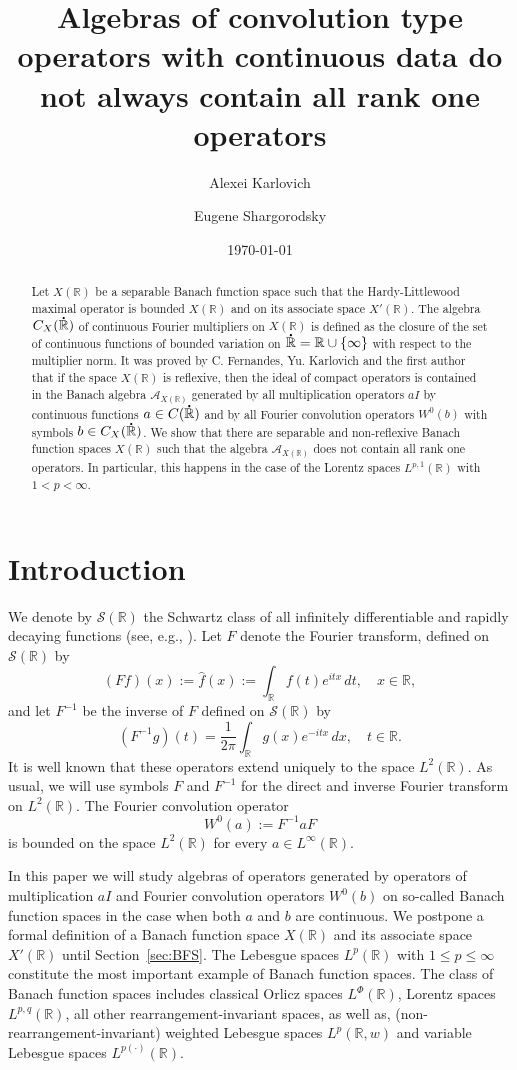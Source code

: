 \documentclass[reqno]{amsproc}
\title[Algebras of convolution type operators]
{Algebras of convolution type operators with continuous data do not 
always contain all rank one operators}
\author[A. Karlovich]{Alexei Karlovich}
\author[E. Shargorodsky]{Eugene Shargorodsky}
\date{\today}
\newcommand{\dR}{{\bf\dot{\R}}}
\newcommand{\R}{\mathbb{R}}
\theoremstyle{definition}
\theoremstyle{remark}
\numberwithin{equation}{section}
\begin{document}
\begin{abstract}
Let $X(\mathbb{R})$ be a separable Banach function space such that the 
Hardy-Littlewood maximal operator is bounded $X(\mathbb{R})$ 
and on its associate space $X'(\mathbb{R})$. The algebra $C_X(\dR)$
of continuous Fourier multipliers on $X(\mathbb{R})$ is defined as the 
closure of the set of continuous functions of bounded variation on 
$\dR=\mathbb{R}\cup\{\infty\}$ with respect to the multiplier norm. It 
was proved by C. Fernandes, Yu. Karlovich and the first author
\cite{FKK19} that if the space $X(\R)$ is reflexive, then the ideal of compact 
operators is contained in the Banach algebra $\mathcal{A}_{X(\mathbb{R})}$ 
generated by all multiplication operators $aI$ by continuous functions 
$a\in C(\dR)$ and by all Fourier convolution operators $W^0(b)$ with symbols 
$b\in C_X(\dR)$. We show that there are separable and non-reflexive 
Banach function spaces $X(\mathbb{R})$ such that the algebra 
$\mathcal{A}_{X(\mathbb{R})}$ does not contain all rank one operators. 
In particular, this happens in the case of the Lorentz spaces 
$L^{p,1}(\mathbb{R})$ with $1<p<\infty$.
\end{abstract}
\maketitle
\section{Introduction}
We denote by $\mathcal{S}(\R)$ the Schwartz class of all infinitely 
differentiable and rapidly decaying functions (see, e.g., 
\cite[Section~2.2.1]{G14}). Let $F$ denote the Fourier transform, defined
on $\mathcal{S}(\R)$ by
\[
(Ff)(x):=\widehat{f}(x):=\int_\R f(t)e^{itx}\,dt,
\quad
x\in\R,
\]
and let $F^{-1}$ be the inverse of $F$ defined on $\mathcal{S}(\R)$ 
by
\[
(F^{-1}g)(t)=\frac{1}{2\pi}\int_\R g(x)e^{-itx}\,d x,
\quad
t\in\R.
\]
It is well known that these operators extend uniquely to the space
$L^2(\R)$. As usual, we will use symbols $F$ and $F^{-1}$ for the
direct and inverse Fourier transform on $L^2(\R)$. 
The Fourier convolution operator 
\[
W^0(a):=F^{-1}aF
\]
is bounded on the space $L^2(\R)$ for every $a\in L^\infty(\R)$.

In this paper we will study algebras of operators generated by 
operators of multiplication $aI$ and Fourier convolution operators
$W^0(b)$ on so-called Banach function spaces in the case when both $a$ and $b$
are continuous. We postpone a formal definition of a Banach function 
space $X(\R)$ and its associate space $X'(\R)$ until Section~\ref{sec:BFS}. 
The Lebesgue spaces $L^p(\R)$ with 
$1\le p\le\infty$ constitute the most important example of Banach function
spaces. The class of Banach function spaces includes classical Orlicz
spaces $L^\Phi(\R)$, Lorentz spaces $L^{p,q}(\R)$, all other 
rearrangement-invariant spaces, as well as, (non-rearrangement-in\-vari\-ant) 
weighted Lebesgue spaces $L^p(\R,w)$ and 
variable Lebesgue spaces $L^{p(\cdot)}(\R)$.
\end{document}
